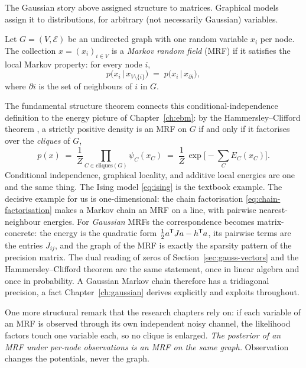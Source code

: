 The Gaussian story above assigned structure to matrices. Graphical
models assign it to distributions, for arbitrary (not necessarily
Gaussian) variables.

\begin{definition}
Let $G = (V, \mathcal{E})$ be an undirected graph with one random
variable $x_i$ per node. The collection $x = (x_i)_{i \in V}$ is a
\emph{Markov random field} (MRF) if it satisfies the local Markov
property: for every node $i$,
\begin{equation}
  p\big(x_i \,\big|\, x_{V \setminus \{i\}}\big)
  \;=\; p\big(x_i \,\big|\, x_{\partial i}\big),
  \label{eq:local-markov}
\end{equation}
where $\partial i$ is the set of neighbours of $i$ in $G$.
\end{definition}

The fundamental structure theorem connects this
conditional-independence definition to the energy picture of
Chapter~\ref{ch:ebm}: by the Hammersley--Clifford theorem
\citep[proved in][]{besag1974spatial}, a strictly positive density is an
MRF on $G$ if and only if it factorises over the \emph{cliques} of $G$,
\begin{equation}
  p(x) \;=\; \frac{1}{Z} \prod_{C \in \mathrm{cliques}(G)} \psi_C(x_C)
  \;=\; \frac{1}{Z}\, \exp\Big[ -\sum_C E_C(x_C) \Big] .
  \label{eq:hammersley-clifford}
\end{equation}
Conditional independence, graphical locality, and additive local
energies are one and the same thing. The Ising model \eqref{eq:ising} is
the textbook example. The decisive example for us is one-dimensional:
the chain factorisation \eqref{eq:chain-factorisation} makes a Markov
chain an MRF on a line, with pairwise nearest-neighbour energies. For
\emph{Gaussian} MRFs the correspondence becomes matrix-concrete: the
energy is the quadratic form $\tfrac12 a^{\mathsf{T}} J a - h^{\mathsf{T}} a$, its pairwise
terms are the entries $J_{ij}$, and the graph of the MRF is exactly the
sparsity pattern of the precision matrix. The dual reading of zeros of
Section~\ref{sec:gauss-vectors} and the Hammersley--Clifford theorem are
the same statement, once in linear algebra and once in probability. A
Gaussian Markov chain therefore has a tridiagonal precision, a fact
Chapter~\ref{ch:gaussian} derives explicitly and exploits throughout.

One more structural remark that the research chapters rely on: if each
variable of an MRF is observed through its own independent noisy channel,
the likelihood factors touch one variable each, so no clique is
enlarged. \emph{The posterior of an MRF under per-node observations is an
MRF on the same graph.} Observation changes the potentials, never the
graph.

